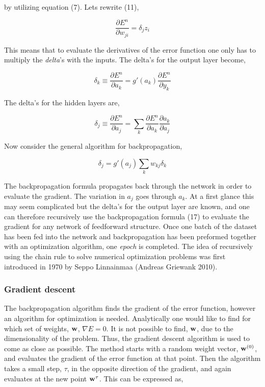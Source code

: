\documentclass[12pt, letterpaper]{amsart}%
\begin{document}
by utilizing equation (7). Lets rewrite (11),

\begin{equation}
    \frac{\partial E^n}{\partial w_{ji}} = \delta_j z_i
\end{equation}

This means that to evaluate the derivatives of the error function one only has to multiply the \textit{delta}'s with the inputs. The delta's for the output layer become,

\begin{equation}
    \delta_k \equiv \frac{\partial E^n}{\partial a_k} = g \prime (a_k) \frac{\partial E^n}{\partial y_k}
\end{equation}

The delta's for the hidden layers are,

\begin{equation}
    \delta_j \equiv \frac{\partial E^n}{\partial a_j} = \sum_k \frac{\partial E^n}{\partial a_k} \frac{\partial a_k}{\partial a_j}
\end{equation}

Now consider the general algorithm for backpropagation,

\begin{equation}
    \delta_j = g \prime (a_j) \sum_k w_{kj} \delta_k
\end{equation}

The backpropagation formula propagates back through the network in order to evaluate the gradient. The variation in $a_j$ goes through $a_k$. At a first glance this may seem complicated but the delta's for the output layer are known, and one can therefore recursively use the backpropagation formula (17) to evaluate the gradient for any network of feedforward structure. Once one batch of the dataset has been fed into the network and backpropagation has been preformed together with an optimization algorithm, one \textit{epoch} is completed. The idea of recursively using the chain rule to solve numerical optimization problems was first introduced in 1970 by Seppo Linnainmaa (Andreas Griewank 2010).

\subsubsection{Gradient descent}
The backpropagation algorithm finds the gradient of the error function, however an algorithm for optimization is needed. Analytically one would like to find for which set of weights, $\bold{w}$, $\nabla E=0$. It is not possible to find, $\bold{w}$, due to the dimensionality of the problem. Thus, the gradient descent algorithm is used to come as close as possible. The method starts with a random weight vector, $\bold{w}^{(0)}$, and evaluates the gradient of the error function at that point. Then the algorithm takes a small step, $\tau$, in the opposite direction of the gradient, and again evaluates at the new point $\bold{w}^{\tau}$. This can be expressed as,
\end{document}

